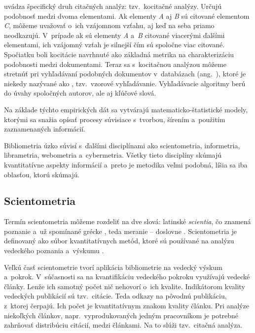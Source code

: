 \citet{Vavrikova2008} uvádza špecifický druh citačných analýz: tzv.~kocitačné
analýzy.  Určujú podobnosť medzi dvoma elementami.  Ak
elementy \emph{A} aj \emph{B} sú citované elementom \emph{C}, môžeme uvažovať
o~ich vzájomnom vzťahu, aj keď na seba priamo neodkazujú.  V~prípade ak sú
elementy \emph{A} a~\emph{B} citované viacerými ďalšími elementami, ich vzájomný
vzťah je silnejší čím sú spoločne viac citované.  Spočiatku boli kocitácie
navrhnuté ako základná metrika na charakterizáciu podobnosti medzi dokumentami.
Teraz sa s~kocitačnou analýzou môžeme stretnúť pri vyhľadávaní podobných
dokumentov v~databázach (ang.~), ktoré je niekedy
nazývané ako , tzv.~vzorové vyhľadávanie.  Vyhľadávacie
algoritmy berú do úvahy spoločných autorov, ale aj kľúčové slová.

Na základe týchto empirických dát sa vytvárajú matematicko-štatistické modely,
ktorými sa snažia opísať procesy súvisiace s~tvorbou, šírením a~použitím
zaznamenaných informácií.

Bibliometria úzko súvisí s~ďalšími disciplínami ako scientometria, informetria,
librametria, webometria a~cybermetria.  Všetky tieto disciplíny skúmajú
kvantitatívne aspekty informácií a~preto je metodika veľmi podobná, líšia sa iba
oblasťou, ktorú skúmajú.


\subsection{Scientometria}

Termín scientometria môžeme rozdeliť na dve slová: latinské
\emph{scientia}, čo znamená poznanie a~už
spomínané grécke , teda
meranie -- doslovne . Scientometria je definovaný ako
súbor kvantitatívnych metód, ktoré sú používané na analýzu vedeckého poznania
a~výskumu \citep{Hood2001}.

Veľkú časť scientometrie tvorí aplikácia bibliometrie na vedecký výskum
a~pokrok.  V~súčasnosti sa na kvantifikáciu vedeckého pokroku využívajú vedecké
články.  Lenže ich samotný počet nič nehovorí o~ich kvalite.  Indikátorom
kvality vedeckých publikácií sú tzv.~citácie.  Teda odkazy na pôvodnú
publikáciu, z~ktorej čerpajú.  Ich počet je kvantitatívnym znakom kvality
článku.  Pri analýze niekoľkých článkov, napr.~vyprodukovaných jedným
pracovníkom je potrebné zahrňovať distribúciu citácií, medzi článkami.  Na to
slúži tzv.~citačná analýza.

